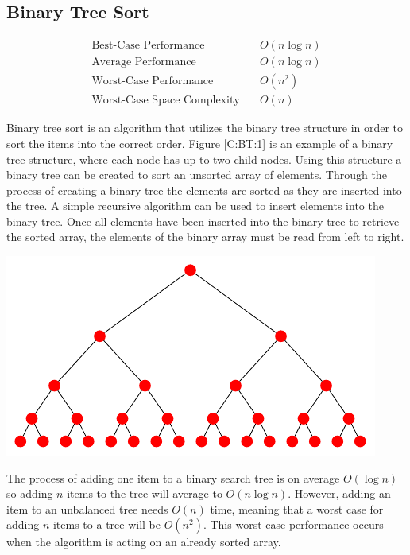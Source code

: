 \documentclass{subfile}
\begin{document}
\subsection{Binary Tree Sort}\label{C:BT}
\begin{align*}
  \text{Best-Case Performance}\quad &O\left(n\log n\right)\\
  \text{Average Performance}\quad &O\left(n\log n\right)\\
  \text{Worst-Case Performance}\quad &O\left(n^{2}\right)\\
  \text{Worst-Case Space Complexity}\quad &O\left(n\right)
\end{align*}
\begin{multicols}{2}
  Binary tree sort is an algorithm that utilizes the binary tree structure in order to sort the items into the correct order. Figure \ref{C:BT:1} is an example of a binary tree structure, where each node has up to two child nodes. Using this structure a binary tree can be created to sort an unsorted array of elements. Through the process of creating a binary tree the elements are sorted as they are inserted into the tree. A simple recursive algorithm can be used to insert elements into the binary tree. Once all elements have been inserted into the binary tree to retrieve the sorted array, the elements of the binary array must be read from left to right.
  \begin{Figure}
    \centering
    \includegraphics[width=\linewidth]{comparison_sorts/binary_tree/img1.pdf}
  \end{Figure}\label{C:BT:1}
  \par
  The process of adding one item to a binary search tree is on average $O\left(\log n\right)$ so adding $n$ items to the tree will average to $O\left( n \log n \right)$. However, adding an item to an unbalanced tree needs $O\left( n\right)$ time, meaning that a worst case for adding $n$ items to a tree will be $O\left( n^{2} \right)$. This worst case performance occurs when the algorithm is acting on an already sorted array.

\end{multicols}
\end{document}

